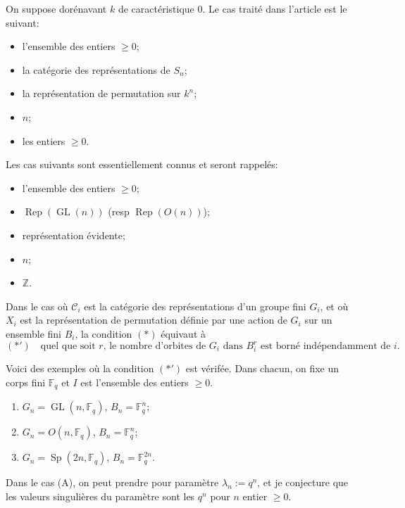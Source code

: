 \documentclass[11pt,a4paper]{article}
\theoremstyle{plain}
\theoremstyle{definition}
\DeclareMathOperator{\Rep}{Rep}
\DeclareMathOperator{\GL}{GL}
\DeclareMathOperator{\Sp}{Sp}
\newcommand{\Z}{\mathbb{Z}}
\begin{document}
On suppose dor\'enavant $k$ de caract\'eristique $0$. Le cas trait\'e dans l'article est le suivant:
\begin{itemize}[label={},leftmargin=*]
\item[$I$:] l'ensemble des entiers $\geq 0$;
\item[$\mathcal{C}_n$:] la cat\'egorie des repr\'esentations de $S_n$;
\item[$X_n$:] la repr\'esentation de permutation sur $k^n$;
\item[param\`etre:] $n$;
\item[valeurs singuli\`eres:] les entiers $\geq 0$.
\end{itemize}

Les cas suivants sont essentiellement connus et seront rappel\'es:
\begin{itemize}[label={},leftmargin=*]
\item[$I$:] l'ensemble des entiers $\geq 0$;
\item[$\mathcal{C}_n$:] $\Rep(\GL(n))$ (resp $\Rep(O(n))$);
\item[$X_n$:] repr\'esentation \'evidente;
\item[param\`etre:] $n$;
\item[valeurs singuli\`eres:] $\Z$.
\end{itemize}

Dans le cas o\`u $\mathcal{C}_i$ est la cat\'egorie des repr\'esentations d'un groupe fini $G_i$, et o\`u $X_i$ est la repr\'esentation de permutation d\'efinie par une action de $G_i$ sur un ensemble fini $B_i$, la condition $(\ast)$ \'equivaut \`a
\begin{equation*}
(\ast') \quad \text{quel que soit $r$, le nombre d'orbites de $G_i$ dans $B_i^r$ est born\'e ind\'ependamment de $i$.}
\end{equation*}

Voici des exemples o\`u la condition $(\ast')$ est v\'erif\'ee. Dans chacun, on fixe un corps fini $\mathbb{F}_q$ et $I$ est l'ensemble des entiers $\geq 0$.
\begin{enumerate}[label=(\Alph*)]
\item $G_n = \GL(n, \mathbb{F}_q)$, $B_n = \mathbb{F}_q^n$;
\item $G_n = O(n, \mathbb{F}_q)$, $B_n = \mathbb{F}_q^n$;
\item $G_n = \Sp(2n, \mathbb{F}_q)$, $B_n = \mathbb{F}_q^{2n}$.
\end{enumerate}

Dans le cas (A), on peut prendre pour param\`etre $\lambda_n := q^n$, et je conjecture que les valeurs singuli\`eres du param\`etre sont les $q^n$ pour $n$ entier $\geq 0$.
\end{document}
